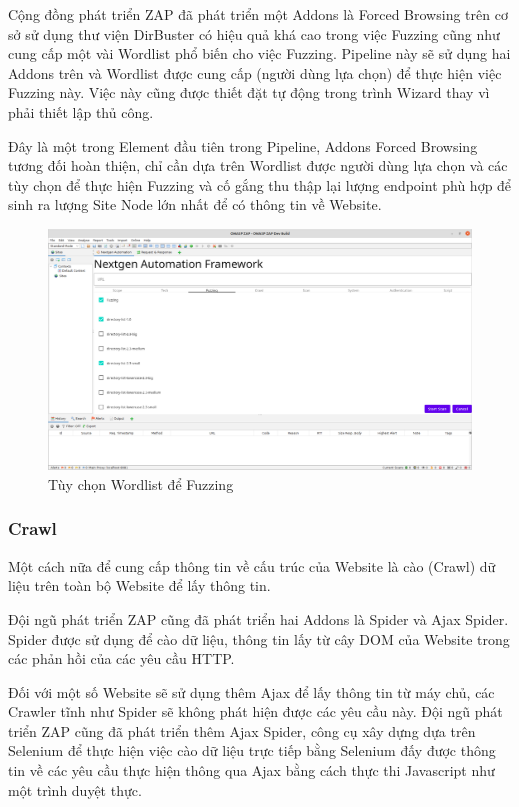 \documentclass[./../main.tex]{subfiles}
\begin{document}
Cộng đồng phát triển ZAP đã phát triển một Addons là Forced Browsing trên
cơ sở sử dụng thư viện DirBuster có hiệu quả khá cao trong việc Fuzzing
cũng như cung cấp một vài Wordlist phổ biến cho việc Fuzzing. Pipeline
này sẽ sử dụng hai Addons trên và Wordlist được cung cấp (người dùng lựa
chọn) để thực hiện việc Fuzzing này. Việc này cũng được thiết đặt tự
động trong trình Wizard thay vì phải thiết lập thủ công.

Đây là một trong Element đầu tiên trong Pipeline, Addons Forced Browsing
tương đối hoàn thiện, chỉ cần dựa trên Wordlist được người dùng lựa chọn
và các tùy chọn để thực hiện Fuzzing và cố gắng thu thập lại lượng
endpoint phù hợp để sinh ra lượng Site Node lớn nhất để có thông tin
về Website.

\begin{figure}[H]
	\includegraphics[width=\linewidth]{./images/fuzz.png}
	\caption{Tùy chọn Wordlist để Fuzzing}
	\label{fig:fuzz}
\end{figure}

\subsubsection{Crawl}

Một cách nữa để cung cấp thông tin về cấu trúc của Website là
cào (Crawl) dữ liệu trên toàn bộ Website để lấy thông tin.

Đội ngũ phát triển ZAP cũng đã phát triển hai Addons là Spider và
Ajax Spider. Spider được sử dụng để cào dữ liệu, thông tin lấy từ cây
DOM của Website trong các phản hồi của các yêu cầu HTTP.

Đối với một số Website sẽ sử dụng thêm Ajax để lấy thông tin từ máy
chủ, các Crawler tĩnh như Spider sẽ không phát hiện được các yêu cầu này.
Đội ngũ phát triển ZAP cũng đã phát triển thêm Ajax Spider, công cụ xây
dựng dựa trên Selenium để thực hiện việc cào dữ liệu trực tiếp bằng
Selenium đấy được thông tin về các yêu cầu thực hiện thông qua Ajax
bằng cách thực thi Javascript như một trình duyệt thực.
\end{document}
